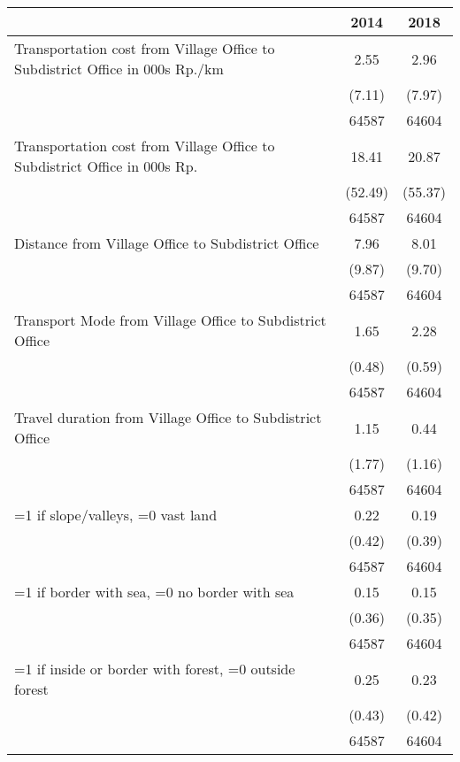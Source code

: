 \begin{tabular}{l*{2}{c}}
\hline\hline
                    &        2014&        2018\\
\hline
Transportation cost from Village Office to Subdistrict Office in 000s Rp./km&        2.55&        2.96\\
                    &      (7.11)&      (7.97)\\
                    &       64587&       64604\\
[1em]
Transportation cost from Village Office to Subdistrict Office in 000s Rp.&       18.41&       20.87\\
                    &     (52.49)&     (55.37)\\
                    &       64587&       64604\\
[1em]
Distance from Village Office to Subdistrict Office&        7.96&        8.01\\
                    &      (9.87)&      (9.70)\\
                    &       64587&       64604\\
[1em]
Transport Mode from Village Office to Subdistrict Office&        1.65&        2.28\\
                    &      (0.48)&      (0.59)\\
                    &       64587&       64604\\
[1em]
Travel duration from Village Office to Subdistrict Office&        1.15&        0.44\\
                    &      (1.77)&      (1.16)\\
                    &       64587&       64604\\
[1em]
=1 if slope/valleys, =0 vast land&        0.22&        0.19\\
                    &      (0.42)&      (0.39)\\
                    &       64587&       64604\\
[1em]
=1 if border with sea, =0 no border with sea&        0.15&        0.15\\
                    &      (0.36)&      (0.35)\\
                    &       64587&       64604\\
[1em]
=1 if inside or border with forest, =0 outside forest&        0.25&        0.23\\
                    &      (0.43)&      (0.42)\\
                    &       64587&       64604\\

\end{tabular}
